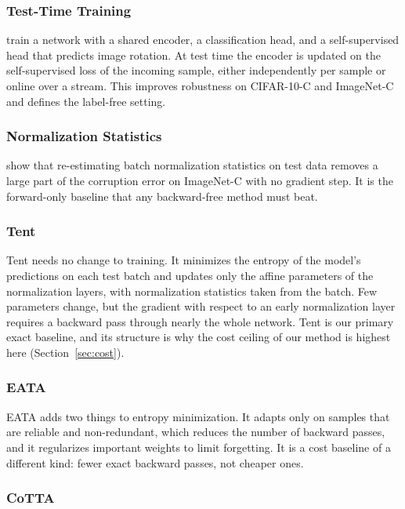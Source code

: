 \documentclass{article}
\begin{document}
\subsubsection{Test-Time Training}

\textcite{sun2020ttt} train a network with a shared encoder, a classification
head, and a self-supervised head that predicts image rotation. At test time the
encoder is updated on the self-supervised loss of the incoming sample, either
independently per sample or online over a stream. This improves robustness on
CIFAR-10-C and ImageNet-C and defines the label-free setting.

\subsubsection{Normalization Statistics}

\textcite{schneider2020covariate} show that re-estimating batch normalization
statistics on test data removes a large part of the corruption error on
ImageNet-C with no gradient step. It is the forward-only baseline that any
backward-free method must beat.

\subsubsection{Tent}

Tent \parencite{wang2021tent} needs no change to training. It minimizes the
entropy of the model's predictions on each test batch and updates only the
affine parameters of the normalization layers, with normalization statistics
taken from the batch. Few parameters change, but the gradient with respect to
an early normalization layer requires a backward pass through nearly the whole
network. Tent is our primary exact baseline, and its structure is why the cost
ceiling of our method is highest here (Section~\ref{sec:cost}).

\subsubsection{EATA}

EATA \parencite{niu2022eata} adds two things to entropy minimization. It adapts
only on samples that are reliable and non-redundant, which reduces the number
of backward passes, and it regularizes important weights to limit forgetting.
It is a cost baseline of a different kind: fewer exact backward passes, not
cheaper ones.

\subsubsection{CoTTA}
\end{document}
